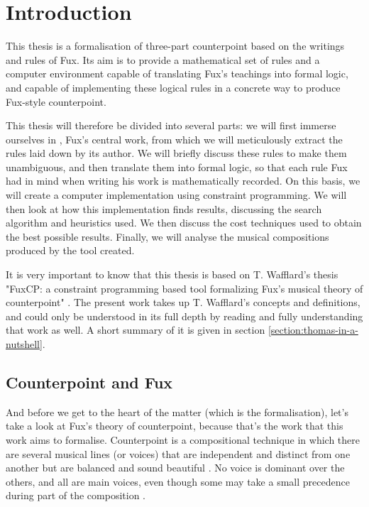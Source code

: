 \chapter{Introduction}
This thesis is a formalisation of three-part counterpoint based on the writings and rules of Fux. Its aim is to provide a mathematical set of rules and a computer environment capable of translating Fux's teachings into formal logic, and capable of implementing these logical rules in a concrete way to produce Fux-style counterpoint.


This thesis will therefore be divided into several parts: we will first immerse ourselves in \gap, Fux's central work, from which we will meticulously extract the rules laid down by its author. We will briefly discuss these rules to make them unambiguous, and then translate them into formal logic, so that each rule Fux had in mind when writing his work is mathematically recorded. On this basis, we will create a computer implementation using constraint programming. We will then look at how this implementation finds results, discussing the search algorithm and heuristics used. We then discuss the cost techniques used to obtain the best possible results. Finally, we will analyse the musical compositions produced by the tool created.

It is very important to know that this thesis is based on T. Wafflard's thesis "FuxCP: a constraint programming based tool formalizing Fux's musical theory of counterpoint" \cite{wafflard2023}. The present work takes up T. Wafflard's concepts and definitions, and could only be understood in its full depth by reading and fully understanding that work as well. A short summary of it is given in section \ref{section:thomas-in-a-nutshell}.



\section{Counterpoint and Fux}
And before we get to the heart of the matter (which is the formalisation), let's take a look at Fux's theory of counterpoint, because that's the work that this work aims to formalise. Counterpoint is a compositional technique in which there are several musical lines (or voices) that are independent and distinct from one another but are balanced and sound beautiful \cite{CpSachs}. No voice is dominant over the others, and all are main voices, even though some may take a small precedence during part of the composition \cite{hess2016}.  



